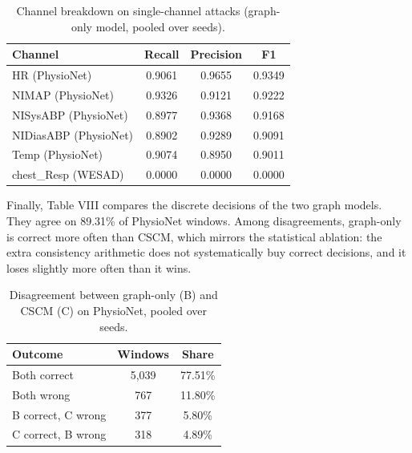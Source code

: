 \documentclass[conference]{IEEEtran}
\begin{document}
\begin{table}[t]
\caption{Channel breakdown on single-channel attacks (graph-only model, pooled over seeds).}
\label{tab:8}
\centering
\small
\begin{tabular}{lccc}
\toprule
Channel & Recall & Precision & F1 \\
\midrule
HR (PhysioNet) & 0.9061 & 0.9655 & 0.9349 \\
NIMAP (PhysioNet) & 0.9326 & 0.9121 & 0.9222 \\
NISysABP (PhysioNet) & 0.8977 & 0.9368 & 0.9168 \\
NIDiasABP (PhysioNet) & 0.8902 & 0.9289 & 0.9091 \\
Temp (PhysioNet) & 0.9074 & 0.8950 & 0.9011 \\
chest\_Resp (WESAD) & 0.0000 & 0.0000 & 0.0000 \\
\bottomrule
\end{tabular}
\end{table}
Finally, Table VIII compares the discrete decisions of the two graph models. They agree on 89.31\% of PhysioNet windows. Among disagreements, graph-only is correct more often than CSCM, which mirrors the statistical ablation: the extra consistency arithmetic does not systematically buy correct decisions, and it loses slightly more often than it wins.
\begin{table}[t]
\caption{Disagreement between graph-only (B) and CSCM (C) on PhysioNet, pooled over seeds.}
\label{tab:8}
\centering
\small
\begin{tabular}{lcc}
\toprule
Outcome & Windows & Share \\
\midrule
Both correct & 5,039 & 77.51\% \\
Both wrong & 767 & 11.80\% \\
B correct, C wrong & 377 & 5.80\% \\
C correct, B wrong & 318 & 4.89\% \\
\bottomrule
\end{tabular}
\end{table}
\end{document}
